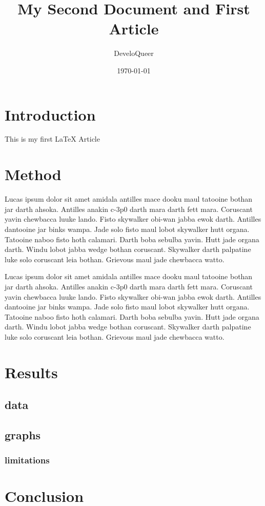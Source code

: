 \documentclass{article}
\title{My Second Document and First Article}
\author{DeveloQueer}
\date{\today}
\begin{document}
\maketitle

\section{Introduction}
This is my first LaTeX Article

\section{Method}
Lucas ipsum dolor sit amet amidala antilles mace dooku maul tatooine bothan jar darth ahsoka. Antilles anakin c-3p0 darth mara darth fett mara. Coruscant yavin chewbacca luuke lando. Fisto skywalker obi-wan jabba ewok darth. Antilles dantooine jar binks wampa. Jade solo fisto maul lobot skywalker hutt organa. Tatooine naboo fisto hoth calamari. Darth boba sebulba yavin. Hutt jade organa darth. Windu lobot jabba wedge bothan coruscant. Skywalker darth palpatine luke solo coruscant leia bothan. Grievous maul jade chewbacca watto.



Lucas ipsum dolor sit amet amidala antilles mace dooku maul tatooine bothan jar darth ahsoka. Antilles anakin c-3p0 darth mara darth fett mara. Coruscant yavin chewbacca luuke lando. Fisto skywalker obi-wan jabba ewok darth. Antilles dantooine jar binks wampa. Jade solo fisto maul lobot skywalker hutt organa. Tatooine naboo fisto hoth calamari. Darth boba sebulba yavin. Hutt jade organa darth. Windu lobot jabba wedge bothan coruscant. Skywalker darth palpatine luke solo coruscant leia bothan. Grievous maul jade chewbacca watto.
\section{Results}
\subsection{data}
\subsection{graphs}
\subsubsection{limitations}

\section{Conclusion}
\end{document}
